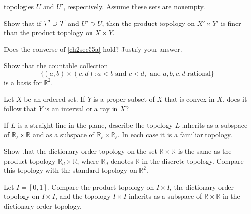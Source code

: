 \begin{exercise}
  topologies \(U\) and \(U'\), respectively.
  Assume these sets are nonempty.
  \begin{exercise}[label = (\alph*), ref = \arabic{exercisei} (\alph*)]
  \item
    \label{ch2sec55a}
    Show that if \(\mathcal{T}'\supset\mathcal{T}\) and \(U'\supset U\), then the product
    topology on \(X'\times Y'\) is finer than the product topology on
    \(X\times Y\).
  \item
    Does the converse of \cref{ch2sec55a} hold?
    Justify your answer.
  \end{exercise}
\item
  Show that the countable collection
  \[
  \{(a, b)\times (c, d)\colon a < b\text{ and } c < d, \text{ and } a, b, c, d
  \text{ rational}\}
  \]
  is a basis for \(\mathbb{R}^2\).
\item
  Let \(X\) be an ordered set.
  If \(Y\) is a proper subset of \(X\) that is convex in \(X\), does it follow
  that \(Y\) is an interval or a ray in \(X\)?
\item
  If \(L\) is a straight line in the plane, describe the topology \(L\)
  inherits as a subspace of \(\mathbb{R}_{\ell}\times\mathbb{R}\) and as a
  subspace of \(\mathbb{R}_{\ell}\times\mathbb{R}_{\ell}\).
  In each case it is a familiar topology.
\item
  Show that the dictionary order topology on the set
  \(\mathbb{R}\times\mathbb{R}\) is the same as the product topology
  \(\mathbb{R}_d\times\mathbb{R}\), where \(\mathbb{R}_d\) denotes
  \(\mathbb{R}\) in the discrete topology.
  Compare this topology with the standard topology on \(\mathbb{R}^2\).
\item
  Let \(I = [0,1]\).
  Compare the product topology on \(I\times I\), the dictionary order topology
  on \(I\times I\), and the topology \(I\times I\) inherits as a subspace of
  \(\mathbb{R}\times\mathbb{R}\) in the dictionary order topology.
\end{exercise}

